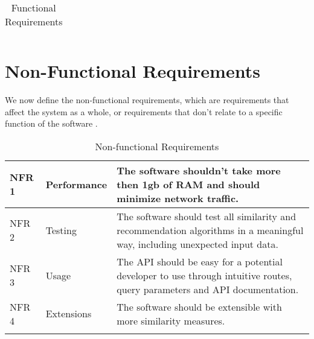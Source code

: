 \begin{longtable}{|p{1.2cm}||p{3.2cm}|p{9cm}|}
  \caption{Functional Requirements}
  \label{tab:fas}
\end{longtable}

\section{Non-Functional Requirements}

\label{sec:non_func_requiremnts}

We now define the non-functional requirements, which are requirements that affect the system as a whole, or requirements that don't relate to a specific function of the software \cite{sommerville2011software}.

\begin{longtable}{|p{1.2cm}||p{3.2cm}|p{9cm}|}
    \hline
    NFR 1 & Performance & The software shouldn't take more then 1gb of RAM and should minimize network traffic.\\
    \hline
    NFR 2 & Testing & The software should test all similarity and recommendation algorithms in a meaningful way, including unexpected input data.\\
    \hline
    NFR 3 & Usage & The API should be easy for a potential developer to use through intuitive routes, query parameters and API documentation.\\
    \hline
    NFR 4 & Extensions & The software should be extensible with more similarity measures.\\
    \hline
  \caption{Non-functional Requirements}
  \label{tab:nfas}
\end{longtable}